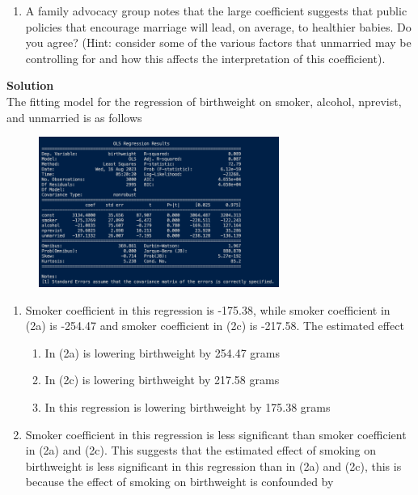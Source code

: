 \documentclass{uofa-eng-assignment}
\begin{document}
\begin{enumerate}
\begin{enumerate}
            \item A family advocacy group notes that the large coefficient suggests that public
                  policies that encourage marriage will lead, on average, to healthier babies. Do
                  you agree? (Hint: consider some of the various factors that unmarried may be
                  controlling for and how this affects the interpretation of this coefficient).
        \end{enumerate} \newpage
        \textbf{Solution} \\
        The fitting model for the regression of birthweight on smoker, alcohol, nprevist, and unmarried is as follows
        \begin{figure}[H]
            \centering
            \includegraphics[width=0.70\textwidth]{p2-4.png}
        \end{figure}
        \begin{enumerate}
            \item Smoker coefficient in this regression is -175.38, while smoker coefficient in
                  (2a) is -254.47 and smoker coefficient in (2c) is -217.58. The estimated effect
                  \begin{enumerate}
                      \item In (2a) is lowering birthweight by 254.47 grams
                      \item In (2c) is lowering birthweight by 217.58 grams
                      \item In this regression is lowering birthweight by 175.38 grams
                  \end{enumerate}
            \item Smoker coefficient in this regression is less significant than smoker
                  coefficient in (2a) and (2c). This suggests that the estimated effect of
                  smoking on birthweight is less significant in this regression than in (2a) and
                  (2c), this is because the effect of smoking on birthweight is confounded by

\end{enumerate}
\end{enumerate}
\end{document}
